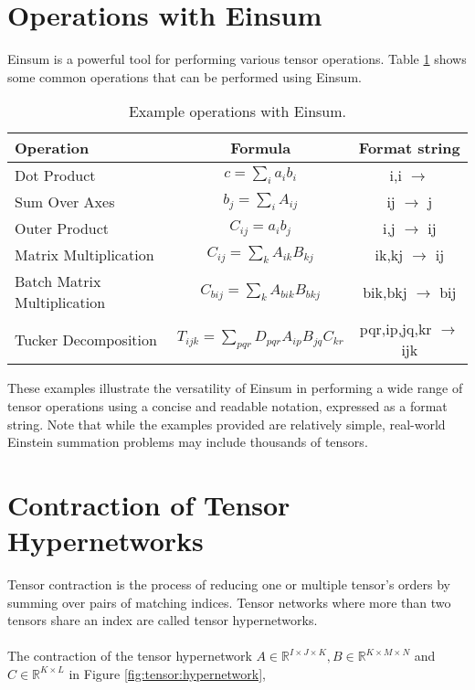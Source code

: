 \section{Operations with Einsum}
Einsum is a powerful tool for performing various tensor operations. Table \ref{tab:einsum:ops}
shows some common operations that can be performed using Einsum.

\begin{table}[hbp]
    \caption{Example operations with Einsum.}
    \label{tab:einsum:ops}
    \centering
    \def\arraystretch{1.1}
    \begin{tabular}{lcc}
        \toprule
        \textbf{Operation}                 & \textbf{Formula}                                    & \textbf{Format string}         \\
        \midrule
        Dot Product                        & $c = \sum_{i} a_{i} b_{i}$                          & i,i $\rightarrow$              \\
        Sum Over Axes                      & $b_{j} = \sum_{i} A_{ij}$                           & ij $\rightarrow$ j             \\
        Outer Product                      & $C_{ij} = a_{i} b_{j}$                              & i,j $\rightarrow$ ij           \\
        Matrix Multiplication              & $C_{ij} = \sum_{k} A_{ik} B_{kj}$                   & ik,kj $\rightarrow$ ij         \\
        Batch Matrix Multiplication        & $C_{bij} = \sum_{k} A_{bik} B_{bkj}$                & bik,bkj $\rightarrow$ bij      \\
        Tucker Decomposition \cite{tucker} & $T_{ijk} = \sum_{pqr} D_{pqr} A_{ip} B_{jq} C_{kr}$ & pqr,ip,jq,kr $\rightarrow$ ijk \\
        \bottomrule
    \end{tabular}
\end{table}

\noindent
These examples illustrate the versatility of Einsum in performing a wide range of
tensor operations using a concise and readable notation, expressed as a format string.
Note that while the examples provided are relatively simple, real-world Einstein
summation problems may include thousands of tensors.

\section{Contraction of Tensor Hypernetworks}
\label{sec:tensor:contractions}
Tensor contraction is the process of reducing one or multiple tensor's orders by summing
over pairs of matching indices. Tensor networks where more than two tensors share an index
are called tensor hypernetworks. 
\\
\\
The contraction of the tensor hypernetwork
$A \in \mathbb{R}^{I \times J \times K}, B \in \mathbb{R}^{K \times M \times N}$ and
$C \in \mathbb{R}^{K \times L}$ in Figure \ref{fig:tensor:hypernetwork},

